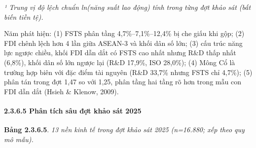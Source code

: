 \documentclass[
  a4paper,
  13pt]{extreport}
\begin{document}
\emph{¹ Trung vị độ lệch chuẩn ln(năng suất lao động) tính trong từng
đợt khảo sát (bất biến tiền tệ).}

Năm phát hiện: (1) FSTS phân tầng 4,7\%--7,1\%--12,4\% bị che giấu khi
gộp; (2) FDI chênh lệch hơn 4 lần giữa ASEAN-3 và khối dân số lớn; (3)
cấu trúc năng lực ngược chiều, khối FDI dẫn dắt có FSTS cao nhất nhưng
R\&D thấp nhất (6,8\%), khối dân số lớn ngược lại (R\&D 17,9\%, ISO
28,0\%); (4) Mông Cổ là trường hợp biên với đặc điểm tài nguyên (R\&D
33,7\% nhưng FSTS chỉ 4,7\%); (5) phân tán trong đợt 1,47 so với 1,25,
phân tầng hai tầng rõ hơn trong mẫu con FDI dẫn dắt (Hsieh \& Klenow,
2009).

\hypertarget{phuxe2n-tuxedch-suxe2u-ux111ux1ee3t-khux1ea3o-suxe1t-2025}{%
\paragraph{2.3.6.5 Phân tích sâu đợt khảo sát
2025}\label{phuxe2n-tuxedch-suxe2u-ux111ux1ee3t-khux1ea3o-suxe1t-2025}}

\textbf{Bảng 2.3.6.5}. \emph{13 nền kinh tế trong đợt khảo sát 2025
(n=16.880; xếp theo quy mô mẫu).}
\end{document}
